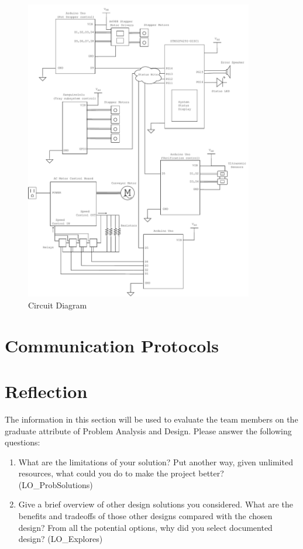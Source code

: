 \documentclass[12pt, titlepage]{article}
\begin{document}
\begin{figure}[H]
  \centering
  \includegraphics[width=0.89\textwidth]{circuit_diagram.pdf}
  \caption{Circuit Diagram}
  \label{fig:circuit}
\end{figure}

\section{Communication Protocols}

\section{Reflection}

The information in this section will be used to evaluate the team members on the
graduate attribute of Problem Analysis and Design.  Please answer the following questions:

\begin{enumerate}
  \item What are the limitations of your solution?  Put another way, given
  unlimited resources, what could you do to make the project better? (LO\_ProbSolutions)
  \item Give a brief overview of other design solutions you considered.  What
  are the benefits and tradeoffs of those other designs compared with the chosen
  design?  From all the potential options, why did you select documented design?
  (LO\_Explores)
\end{enumerate}
\end{document}
